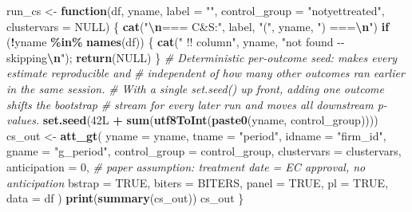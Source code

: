 \documentclass[
]{article}
\newenvironment{Shaded}{\begin{snugshade}}{\end{snugshade}}
\newcommand{\AttributeTok}[1]{\textcolor[rgb]{0.13,0.29,0.53}{#1}}
\newcommand{\CommentTok}[1]{\textcolor[rgb]{0.56,0.35,0.01}{\textit{#1}}}
\newcommand{\ConstantTok}[1]{\textcolor[rgb]{0.56,0.35,0.01}{#1}}
\newcommand{\ControlFlowTok}[1]{\textcolor[rgb]{0.13,0.29,0.53}{\textbf{#1}}}
\newcommand{\DataTypeTok}[1]{\textcolor[rgb]{0.13,0.29,0.53}{#1}}
\newcommand{\DecValTok}[1]{\textcolor[rgb]{0.00,0.00,0.81}{#1}}
\newcommand{\FunctionTok}[1]{\textcolor[rgb]{0.13,0.29,0.53}{\textbf{#1}}}
\newcommand{\NormalTok}[1]{#1}
\newcommand{\OtherTok}[1]{\textcolor[rgb]{0.56,0.35,0.01}{#1}}
\newcommand{\SpecialCharTok}[1]{\textcolor[rgb]{0.81,0.36,0.00}{\textbf{#1}}}
\newcommand{\StringTok}[1]{\textcolor[rgb]{0.31,0.60,0.02}{#1}}
\begin{document}
\begin{Shaded}
\begin{Highlighting}[]
\NormalTok{run\_cs }\OtherTok{\textless{}{-}} \ControlFlowTok{function}\NormalTok{(df, yname, }\AttributeTok{label =} \StringTok{""}\NormalTok{,}
                   \AttributeTok{control\_group =} \StringTok{"notyettreated"}\NormalTok{,}
                   \AttributeTok{clustervars   =} \ConstantTok{NULL}\NormalTok{) \{}
  \FunctionTok{cat}\NormalTok{(}\StringTok{"}\SpecialCharTok{\textbackslash{}n}\StringTok{=== C\&S:"}\NormalTok{, label, }\StringTok{"("}\NormalTok{, yname, }\StringTok{") ===}\SpecialCharTok{\textbackslash{}n}\StringTok{"}\NormalTok{)}
  \ControlFlowTok{if}\NormalTok{ (}\SpecialCharTok{!}\NormalTok{yname }\SpecialCharTok{\%in\%} \FunctionTok{names}\NormalTok{(df)) \{}
    \FunctionTok{cat}\NormalTok{(}\StringTok{"  !! column"}\NormalTok{, yname, }\StringTok{"not found {-}{-} skipping}\SpecialCharTok{\textbackslash{}n}\StringTok{"}\NormalTok{); }\FunctionTok{return}\NormalTok{(}\ConstantTok{NULL}\NormalTok{)}
\NormalTok{  \}}
  \CommentTok{\# Deterministic per{-}outcome seed: makes every estimate reproducible and}
  \CommentTok{\# independent of how many other outcomes ran earlier in the same session.}
  \CommentTok{\# With a single set.seed() up front, adding one outcome shifts the bootstrap}
  \CommentTok{\# stream for every later run and moves all downstream p{-}values.}
  \FunctionTok{set.seed}\NormalTok{(}\DecValTok{42}\DataTypeTok{L} \SpecialCharTok{+} \FunctionTok{sum}\NormalTok{(}\FunctionTok{utf8ToInt}\NormalTok{(}\FunctionTok{paste0}\NormalTok{(yname, control\_group))))}
\NormalTok{  cs\_out }\OtherTok{\textless{}{-}} \FunctionTok{att\_gt}\NormalTok{(}
    \AttributeTok{yname =}\NormalTok{ yname, }\AttributeTok{tname =} \StringTok{"period"}\NormalTok{, }\AttributeTok{idname =} \StringTok{"firm\_id"}\NormalTok{, }\AttributeTok{gname =} \StringTok{"g\_period"}\NormalTok{,}
    \AttributeTok{control\_group =}\NormalTok{ control\_group, }\AttributeTok{clustervars =}\NormalTok{ clustervars,}
    \AttributeTok{anticipation =} \DecValTok{0}\NormalTok{,   }\CommentTok{\# paper assumption: treatment date = EC approval, no anticipation}
    \AttributeTok{bstrap =} \ConstantTok{TRUE}\NormalTok{, }\AttributeTok{biters =}\NormalTok{ BITERS, }\AttributeTok{panel =} \ConstantTok{TRUE}\NormalTok{, }\AttributeTok{pl =} \ConstantTok{TRUE}\NormalTok{, }\AttributeTok{data =}\NormalTok{ df}
\NormalTok{  )}
  \FunctionTok{print}\NormalTok{(}\FunctionTok{summary}\NormalTok{(cs\_out))}
\NormalTok{  cs\_out}
\NormalTok{\}}


\end{Highlighting}
\end{Shaded}
\end{document}
